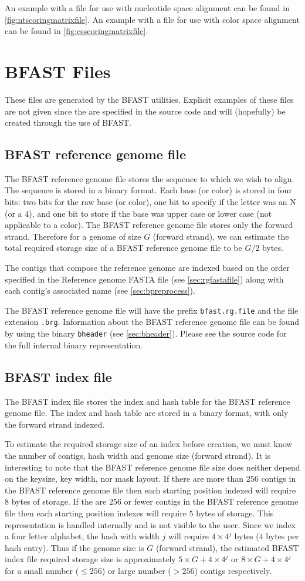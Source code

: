 \documentclass[a4paper,12pt]{book}
\newcommand{\TT}[1]{{\tt #1}} %
\newcommand{\RGFF}{Reference genome FASTA file}
\newcommand{\BRGF}{BFAST reference genome file} %
\newcommand{\BIF}{BFAST index file} %
\begin{document}
An example with a file for use with nucleotide space alignment can be found in \autoref{fig:ntscoringmatrixfile}.
An example with a file for use with color space alignment can be found in \autoref{fig:csscoringmatrixfile}.

\section{BFAST Files}
These files are generated by the BFAST utilities. 
Explicit examples of these files are not given since the are specified in the source code and will (hopefully) be created through the use of BFAST.
\label{sec:bfastfiles}
\subsection{\BRGF{}}
\label{sec:brgf}
The \BRGF{} stores the sequence to which we wish to align.
The sequence is stored in a binary format.
Each base (or color) is stored in four bits: two bits for the raw base (or color), one bit to specify if the letter was an N (or a $4$), and one bit to store if the base was upper case or lower case (not applicable to a color).
The \BRGF{} stores only the forward strand.
Therefore for a genome of size $G$ (forward strand), we can estimate the total required storage size of a \BRGF{} to be $G/2$ bytes.

The contigs that compose the reference genome are indexed based on the order specified in the \RGFF{} (see \autoref{sec:rgfastafile}) along with each contig's associated name (see \autoref{sec:bpreprocess}).

The \BRGF{} will have the prefix \TT{bfast.rg.file} and the file extension \TT{.brg}.
Information about the \BRGF{} can be found by using the binary \TT{bheader} (see \autoref{sec:bheader}).
Please see the source code for the full internal binary representation.

\subsection{\BIF{}}
\label{sec:bif}
The \BIF{} stores the index and hash table for the \BRGF{}.
The index and hash table are stored in a binary format, with only the forward strand indexed.

To estimate the required storage size of an index before creation, we must know the number of contigs, hash width and genome size (forward strand).
It is interesting to note that the \BRGF{} size does neither depend on the keysize, key width, nor mask layout. 
If there are more than $256$ contigs in the \BRGF{} then each starting position indexed will require $8$ bytes of storage.
If the are $256$ or fewer contigs in the \BRGF{} then each starting position indexes will require $5$ bytes of storage.
This representation is handled internally and is not visible to the user.
Since we index a four letter alphabet, the hash with width $j$ will require $4\times4^j$ bytes ($4$ bytes per hash entry).
Thus if the genome size is $G$ (forward strand), the estimated \BIF{} required storage size is approximately $5\times G + 4\times 4^j$ or $8\times G + 4\times 4^j$ for a small number ($\leq 256$) or large number ($>256$) contigs respectively. 
\end{document}
